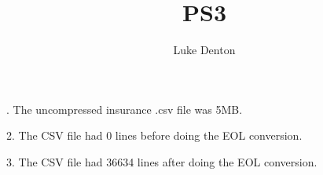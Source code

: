 \documentclass{homeworg}
\title{PS3}
\author{Luke Denton}
\begin{document}
\maketitle

. The uncompressed insurance .csv file was 5MB.

2. The CSV file had 0 lines before doing the EOL conversion.

3. The CSV file had 36634 lines after doing the EOL conversion.
\end{document}
